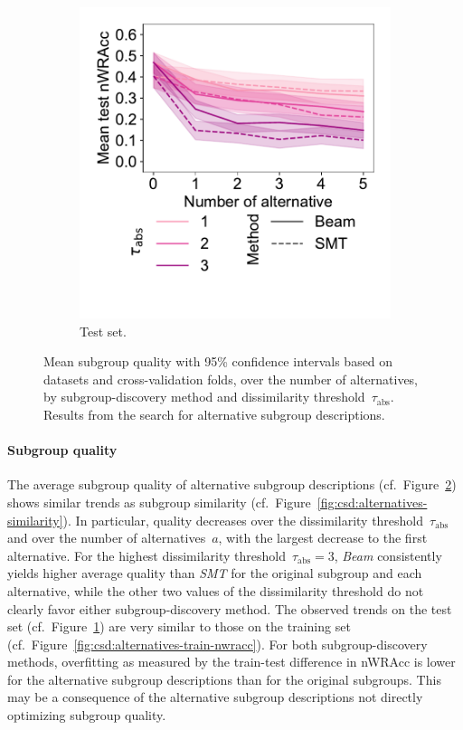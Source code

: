 \documentclass{article}
\theoremstyle{definition}
\begin{document}
\begin{figure}[t]
\begin{subfigure}[t]{0.48\textwidth}
		\includegraphics[width=\textwidth, trim=20 50 15 15, clip]{plots/csd-alternatives-test-nwracc.pdf}
		\caption{Test set.}
		\label{fig:csd:alternatives-test-nwracc}
	\end{subfigure}
	\caption{
		Mean subgroup quality with 95\% confidence intervals based on datasets and cross-validation folds, over the number of alternatives, by subgroup-discovery method and dissimilarity threshold~$\tau_{\text{abs}}$.
		Results from the search for alternative subgroup descriptions.
	}
	\label{fig:csd:alternatives-nwracc}
\end{figure}

\paragraph{Subgroup quality}

The average subgroup quality of alternative subgroup descriptions (cf.~Figure~\ref{fig:csd:alternatives-nwracc}) shows similar trends as subgroup similarity (cf.~Figure~\ref{fig:csd:alternatives-similarity}).
In particular, quality decreases over the dissimilarity threshold~$\tau_{\text{abs}}$ and over the number of alternatives~$a$, with the largest decrease to the first alternative.
For the highest dissimilarity threshold~$\tau_{\text{abs}} = 3$, \emph{Beam} consistently yields higher average quality than \emph{SMT} for the original subgroup and each alternative, while the other two values of the dissimilarity threshold do not clearly favor either subgroup-discovery method.
The observed trends on the test set (cf.~Figure~\ref{fig:csd:alternatives-test-nwracc}) are very similar to those on the training set (cf.~Figure~\ref{fig:csd:alternatives-train-nwracc}).
For both subgroup-discovery methods, overfitting as measured by the train-test difference in nWRAcc is lower for the alternative subgroup descriptions than for the original subgroups.
This may be a consequence of the alternative subgroup descriptions not directly optimizing subgroup quality.
\end{document}
